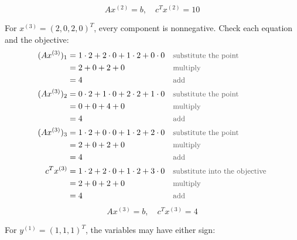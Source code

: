 \documentclass[a4paper,11pt]{article}
\newif\ifexplain
\newcommand{\why}[1]{\text{\small\color{black!65}#1}}
\newcommand{\explain}[1]{\ifexplain\begin{erklbox}#1\end{erklbox}\fi}
\begin{document}
\[\boxed{Ax^{(2)}=b,\quad c^Tx^{(2)}=10}\]
\explain{Jede Zeile muss genau die rechte Seite $4$ treffen. Nichtnegativität allein reicht für die primale Zulässigkeit nicht. Erst nach dieser Probe berechnen wir den Zielfunktionswert.}
For $x^{(3)}=(2,0,2,0)^T$, every component is nonnegative. Check each equation and the objective:
\begin{align*}
(Ax^{(3)})_1 &= 1\cdot 2 + 2\cdot 0 + 1\cdot 2 + 0\cdot 0 && \why{substitute the point}\\
&= 2 + 0 + 2 + 0 && \why{multiply}\\
&= 4 && \why{add}\\
(Ax^{(3)})_2 &= 0\cdot 2 + 1\cdot 0 + 2\cdot 2 + 1\cdot 0 && \why{substitute the point}\\
&= 0 + 0 + 4 + 0 && \why{multiply}\\
&= 4 && \why{add}\\
(Ax^{(3)})_3 &= 1\cdot 2 + 0\cdot 0 + 1\cdot 2 + 2\cdot 0 && \why{substitute the point}\\
&= 2 + 0 + 2 + 0 && \why{multiply}\\
&= 4 && \why{add}\\
c^Tx^{(3)} &= 1\cdot 2 + 2\cdot 0 + 1\cdot 2 + 3\cdot 0 && \why{substitute into the objective}\\
&= 2 + 0 + 2 + 0 && \why{multiply}\\
&= 4 && \why{add}
\end{align*}
\[\boxed{Ax^{(3)}=b,\quad c^Tx^{(3)}=4}\]
\explain{Jede Zeile muss genau die rechte Seite $4$ treffen. Nichtnegativität allein reicht für die primale Zulässigkeit nicht. Erst nach dieser Probe berechnen wir den Zielfunktionswert.}
For $y^{(1)}=(1,1,1)^T$, the variables may have either sign:
\end{document}
